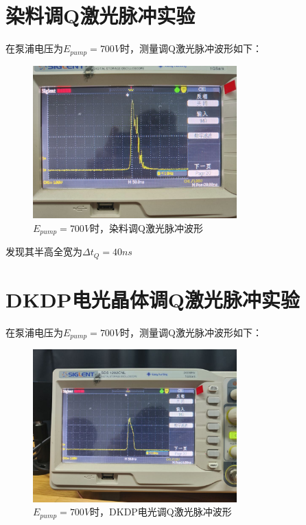 \documentclass[a4paper,UTF8]{ctexart}
\begin{document}
\section{染料调Q激光脉冲实验}

在泵浦电压为$E_{pump} = 700V$时，测量调Q激光脉冲波形如下：

\begin{figure}[H]
    \centering
    \begin{minipage}[b]{0.9\textwidth}
        \centering
        \includegraphics[width=0.7\textwidth]{./ffig4.jpg}
        \caption{$E_{pump} = 700V$时，染料调Q激光脉冲波形}
    \end{minipage}
\end{figure}

发现其半高全宽为$\Delta t_{Q} = 40 ns$

\section{DKDP电光晶体调Q激光脉冲实验}

在泵浦电压为$E_{pump} = 700V$时，测量调Q激光脉冲波形如下：

\begin{figure}[H]
    \centering
    \begin{minipage}[b]{0.9\textwidth}
        \centering
        \includegraphics[width=0.7\textwidth]{./ffig5.jpg}
        \caption{$E_{pump} = 700V$时，DKDP电光调Q激光脉冲波形}
    \end{minipage}
\end{figure}
\end{document}
